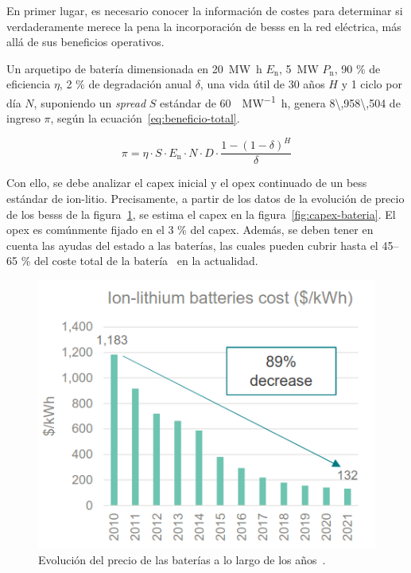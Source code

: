 En primer lugar, es necesario conocer la información de costes para determinar si verdaderamente merece la pena la incorporación de \glspl{bess} en la red eléctrica, más allá de sus beneficios operativos.

Un arquetipo de batería dimensionada en \SI{20}{\mega\watt\hour} \( E_{\mathrm{n}} \), \SI{5}{\mega\watt} \( P_{\mathrm{n}} \), 90 \% de eficiencia \( \eta \), 2 \% de degradación anual \( \delta \), una vida útil de 30 años \( H \) y 1 ciclo por día \( N \), suponiendo un \textit{spread} \( S \) estándar de \SI{60}{\text{\euro}\per\mega\watt\hour}, genera \SI{8\,958\,504}{\text{\euro}} de ingreso \( \pi \), según la ecuación~\ref{eq:beneficio-total}.

\begin{equation}%
  \label{eq:beneficio-total}
  \pi = \eta \cdot S \cdot E_{\mathrm{n}} \cdot N \cdot D \cdot \frac{1 - {(1 - \delta)}^{H}}{\delta}
\end{equation}

Con ello, se debe analizar el \gls{capex} inicial y el \gls{opex} continuado de un \gls{bess} estándar de ion-litio. Precisamente, a partir de los datos de la evolución de precio de los \glspl{bess} de la figura~\ref{fig:precio-bateria}, se estima el \gls{capex} en la figura~\ref{fig:capex-bateria}. El \gls{opex} es comúnmente fijado en el 3 \% del \gls{capex}. Además, se deben tener en cuenta las ayudas del estado a las baterías, las cuales pueden cubrir hasta el 45--65 \% del coste total de la batería~\cite{solfy2025subvenciones} en la actualidad.

\begin{figure}
  \centering
  \includegraphics[width=0.5\linewidth]{figures/precio-bateria.png}
  \caption[Evolución del precio de las baterías a lo largo de los años.]{Evolución del precio de las baterías a lo largo de los años~\cite{bnef2025strategic}.}%
  \label{fig:precio-bateria}
\end{figure}

